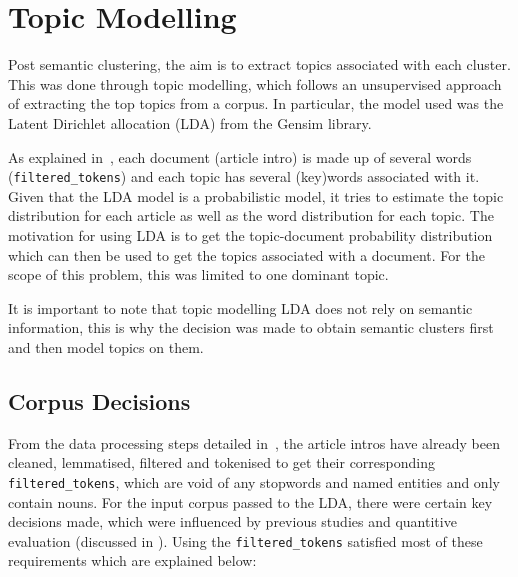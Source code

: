 \section{Topic Modelling}

Post semantic clustering, the aim is to extract topics associated with each cluster. This was done through topic modelling, which follows an unsupervised approach of extracting the top topics from a corpus. In particular, the model used was the Latent Dirichlet allocation (LDA) from the Gensim library. 

As explained in~, each document (article intro) is made up of several words (\texttt{filtered\_tokens}) and each topic has several (key)words associated with it. Given that the LDA model is a probabilistic model, it tries to estimate the topic distribution for each article as well as the word distribution for each topic. The motivation for using LDA is to get the topic-document probability distribution which can then be used to get the topics associated with a document. For the scope of this problem, this was limited to one dominant topic. 

It is important to note that topic modelling LDA does not rely on semantic information, this is why the decision was made to obtain semantic clusters first and then model topics on them.
\vspace{-1ex}
\subsection{Corpus Decisions}

From the data processing steps detailed in~, the article intros have already been cleaned, lemmatised, filtered and tokenised to get their corresponding \texttt{filtered\_tokens}, which are void of any stopwords and named entities and only contain nouns. For the input corpus passed to the LDA, there were certain key decisions made, which were influenced by previous studies and quantitive evaluation (discussed in ). Using the \texttt{filtered\_tokens} satisfied most of these requirements which are explained below: 

